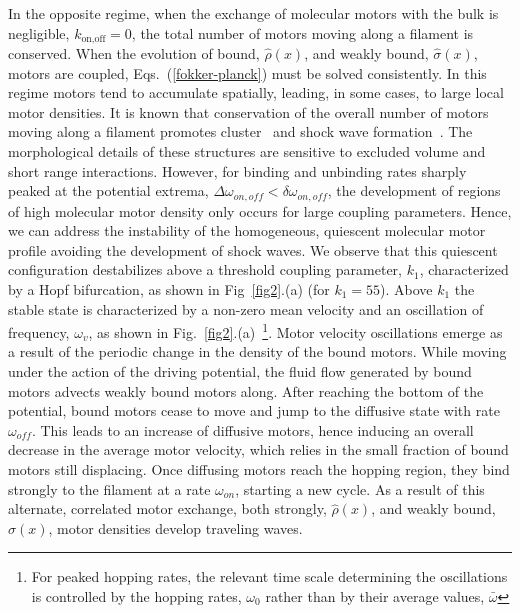 \documentclass[prl,aps,twocolumn, floatfix, superscriptaddress,showpacs]{revtex4}
\begin{document}
In the opposite regime, when the exchange of molecular motors with the bulk is negligible, $k_{\mbox{on,off}}=0$, the total number of  motors moving along a filament is conserved.
When the evolution of bound, $\hat\rho(x)$, and weakly bound, $\hat\sigma(x)$, motors are coupled, Eqs.~(\ref{fokker-planck}) must be solved consistently. In this regime motors tend to accumulate spatially, leading, in some cases,   to large local motor densities. It is known that conservation of the overall number of motors moving along a filament promotes cluster~\cite{Malgaretti} and shock wave formation~\cite{Aghababaie}. The morphological details of these structures are sensitive to  excluded volume and short range interactions. However, for binding and unbinding rates sharply peaked  at the potential extrema, $\Delta\omega_{on,off}<\delta\omega_{on,off}$, the development of regions of high molecular motor density only occurs for large coupling parameters. Hence, we can address the instability of the homogeneous, quiescent molecular motor profile  avoiding the development of shock waves. We observe that this quiescent  configuration destabilizes above a threshold coupling parameter, $k_1$, characterized by a Hopf bifurcation, as shown in  Fig~\ref{fig2}.(a) (for $k_1=55$). Above $k_1$ the stable state is characterized by  a non-zero mean velocity and an oscillation of frequency, $\omega_v$, as shown in Fig.~\ref{fig2}.(a)~\footnote{For peaked hopping rates, the relevant time scale determining the oscillations is controlled by the hopping rates, $\omega_0$ rather than by their average values, $\bar{\omega}$}. Motor velocity oscillations emerge as a result of  the periodic change in the density of the bound motors. While moving under the action of the driving potential, the fluid flow generated by bound motors  advects  weakly bound motors along. After reaching the bottom of the potential, bound motors cease to move and jump   to the diffusive state with rate $\omega_{off}$. This leads to an increase of  diffusive motors, hence inducing an overall decrease in the average motor velocity, which relies in the small fraction of bound motors still displacing.  Once diffusing motors reach the hopping region, they bind strongly to the filament at a rate  $\omega_{on}$, starting a new cycle. As a result of this alternate, correlated motor exchange, both strongly, $\hat{\rho}(x)$, and weakly bound, $\hat{\sigma}(x)$, motor densities develop traveling waves.
\end{document}

